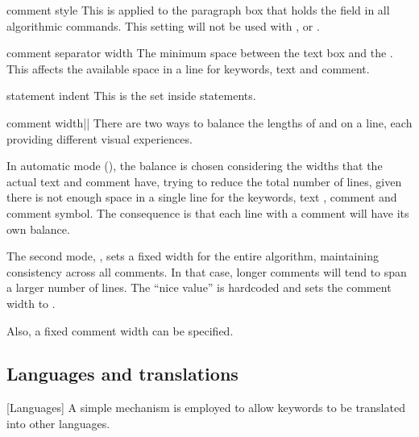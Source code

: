 \documentclass[a4paper, 11pt]{article}
\begin{document}
\begin{option}{comment style}{}
    This  is applied to the paragraph box that holds the  field in all algorithmic commands. This setting will not be used with ,  or .
\end{option}

\begin{option}{comment separator width}{}
    The minimum space between the text box and the . This affects the available space in a line for keywords, text and comment.
\end{option}

\begin{option}{statement indent}{}
    This is the  set inside  statements.
\end{option}

\begin{option}{comment width}{||}
    There are two ways to balance the lengths of  and  on a line, each providing different visual experiences.

    In automatic mode (), the balance is chosen considering the widths that the actual text and comment have, trying to reduce the total number of lines, given there is not enough space in a single line for the keywords, text , comment and comment symbol. The consequence is that each line with a comment will have its own balance.

    The second mode, , sets a fixed width for the entire algorithm, maintaining consistency across all comments. In that case, longer comments will tend to span a larger number of lines. The ``nice value'' is hardcoded and sets the comment width to .

    Also, a fixed comment width can be specified.
\end{option}

\begin{comment}
    parameter indent = 0pt,
\end{comment}

\subsection{Languages and translations}\label{sec:languages-and-translations}
[Languages]%
A simple mechanism is employed to allow keywords to be translated into other languages.
\end{document}
